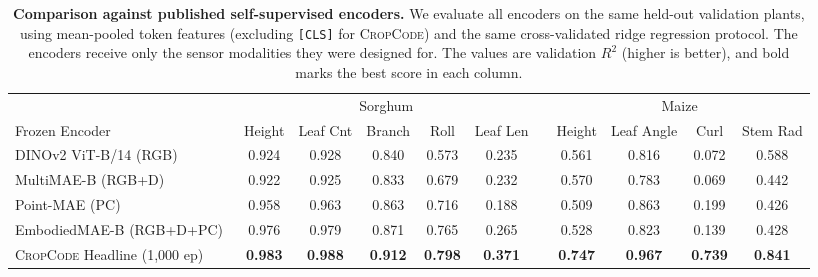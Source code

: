 \documentclass[10pt,twocolumn,letterpaper]{article}
\newcommand{\method}{\textup{\textsc{CropCode}}}   %
\providecommand{\CropCode}{\textsc{CropCode}}
\begin{document}
\begin{table}[t]
  \caption{\textbf{Comparison against published self-supervised encoders.} We evaluate all encoders on the same held-out validation plants, using mean-pooled token features (excluding \texttt{[CLS]} for \method{}) and the same cross-validated ridge regression protocol. The encoders receive only the sensor modalities they were designed for. The values are validation $R^2$ (higher is better), and bold marks the best score in each column.}
  \label{tab:e8}\label{tab:baselines}
  \centering\scriptsize
  \setlength{\tabcolsep}{2.6pt}
  \begin{tabular}{l ccc cc c cccc}
    \toprule
    & \multicolumn{5}{c}{Sorghum} & & \multicolumn{4}{c}{Maize} \\
    \cmidrule(lr){2-6}\cmidrule(lr){8-11}
    Frozen Encoder & Height & Leaf Cnt & Branch & Roll & Leaf Len & & Height & Leaf Angle & Curl & Stem Rad \\
    \midrule
    DINOv2 ViT-B/14 (RGB)~\cite{oquab2024dinov2} & 0.924 & 0.928 & 0.840 & 0.573 & 0.235 & & 0.561 & 0.816 & 0.072 & 0.588 \\
    MultiMAE-B (RGB+D)~\cite{bachmann2022multimae} & 0.922 & 0.925 & 0.833 & 0.679 & 0.232 & & 0.570 & 0.783 & 0.069 & 0.442 \\
    Point-MAE (PC)~\cite{pang2022pointmae} & 0.958 & 0.963 & 0.863 & 0.716 & 0.188 & & 0.509 & 0.863 & 0.199 & 0.426 \\
    EmbodiedMAE-B (RGB+D+PC)~\cite{dong2025embodiedmae} & 0.976 & 0.979 & 0.871 & 0.765 & 0.265 & & 0.528 & 0.823 & 0.139 & 0.428 \\
    \CropCode{} Headline (1{,}000 ep) & \textbf{0.983} & \textbf{0.988} & \textbf{0.912} & \textbf{0.798} & \textbf{0.371} & & \textbf{0.747} & \textbf{0.967} & \textbf{0.739} & \textbf{0.841} \\
    \bottomrule
  \end{tabular}
\end{table}
\end{document}
